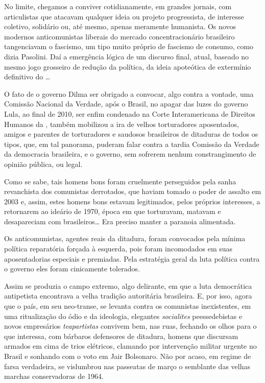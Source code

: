 No limite, chegamos a conviver cotidianamente, em grandes jornais, com
articulistas que atacavam qualquer ideia ou projeto progressista, de
interesse coletivo, solidário ou, até mesmo, apenas meramente humanista.
Os novos modernos anticomunistas liberais do mercado concentracionário
brasileiro tangenciavam o fascismo, um tipo muito próprio de fascismo de
consumo, como dizia Pasolini. Daí a emergência lógica de um discurso
final, atual, baseado no mesmo jogo grosseiro de redução da política, da
ideia apoteótica de extermínio definitivo do …

O fato de o governo Dilma ser obrigado a convocar, algo contra a vontade,
uma Comissão Nacional da Verdade, após o Brasil, no apagar das luzes do
governo Lula, ao final de 2010, ser enfim condenado na Corte
Interamericana de Direitos Humanos da , também mobilizou a ira de
velhos torturadores aposentados, amigos e parentes de torturadores e
saudosos brasileiros de ditaduras de todos os tipos, que, em tal
panorama, puderam falar contra a tardia Comissão da Verdade da
democracia brasileira, e o governo, sem sofrerem nenhum constrangimento
de opinião pública, ou legal.

Como se sabe, tais homens bons foram cruelmente perseguidos pela sanha
revanchista dos comunistas derrotados, que haviam tomado o poder de
assalto em 2003 e, assim, estes homens bons estavam legitimados, pelos
próprios interesses, a retornarem ao ideário de 1970, época em que
torturavam, matavam e desapareciam com brasileiros… Era preciso manter
a paranoia alimentada.

Os anticomunistas, agentes reais da ditadura, foram convocados pela
mínima política reparatória forçada à esquerda, pois foram incomodados
em suas aposentadorias especiais e premiadas. Pela estratégia geral da
luta política contra o governo eles foram cinicamente tolerados.

Assim se produzia o campo extremo, algo delirante, em que a luta
democrática antipetista encontrava a velha tradição autoritária
brasileira. E, por isso, agora que o país, em seu neo-transe, se levanta
contra os comunistas inexistentes, em uma ritualização do ódio e da
ideologia, elegantes \textit{socialites} peessedebistas e novos empresários
\emph{teapartistas} convivem bem, nas ruas, fechando os olhos para o que
interessa, com bárbaros defensores de ditadura, homens que discursam
armados em cima de trios elétricos, clamando por intervenção militar
urgente no Brasil e sonhando com o voto em Jair Bolsonaro. Não por
acaso, em regime de farsa verdadeira, se vislumbrou nas passeatas de
março o semblante das velhas marchas conservadoras de 1964.

